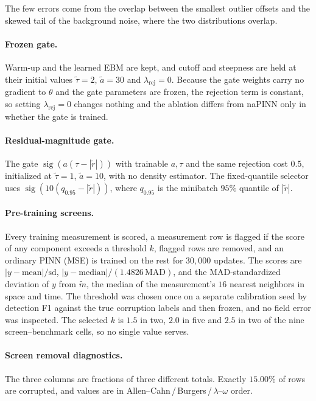 \documentclass[twoside]{article}
\newcommand{\rej}{\lambda_{\mathrm{rej}}}
\DeclareMathOperator{\sig}{sig}
\begin{document}
\noindent
The few errors come from the overlap between the smallest outlier offsets and
the skewed tail of the background noise, where the two distributions overlap.

\paragraph{Frozen gate.}
Warm-up and the learned EBM are kept, and cutoff and steepness are held at their
initial values $\tilde\tau = 2$, $\tilde a = 30$ and $\rej = 0$. Because the gate weights
carry no gradient to $\theta$ and the gate parameters are frozen, the rejection
term is constant, so setting $\rej = 0$ changes nothing and the ablation differs
from naPINN only in whether the gate is trained.

\paragraph{Residual-magnitude gate.}
The gate $\sig(a(\tau - |\tilde r|))$ with trainable $a, \tau$ and the same
rejection cost $0.5$, initialized at $\tilde\tau = 1$, $\tilde a = 10$, with no density
estimator.
The fixed-quantile selector uses $\sig(10(q_{0.95} - |\tilde r|))$, where
$q_{0.95}$ is the minibatch $95\%$ quantile of $|\tilde r|$.

\paragraph{Pre-training screens.}
\label{app:screens}
Every training measurement is scored, a measurement row is flagged if the score
of any component exceeds a threshold $k$, flagged rows are removed, and an ordinary
PINN (MSE) is trained on the rest for $30{,}000$ updates. The scores are
$|y - \mathrm{mean}|/\mathrm{sd}$, $|y - \mathrm{median}|/(1.4826\,
\mathrm{MAD})$, and the MAD-standardized deviation of $y$ from $\tilde m$, the
median of the measurement's $16$ nearest neighbors in space and time. The threshold was chosen once on a separate calibration seed by
detection F1 against the true corruption labels and then frozen, and no field error
was inspected. The selected $k$ is $1.5$ in two, $2.0$ in five and $2.5$ in two
of the nine screen--benchmark cells, so no single value serves.

\paragraph{Screen removal diagnostics.}
The three columns are fractions of three different totals. Exactly $15.00\%$ of
rows are corrupted, and values are in Allen--Cahn\,/\,Burgers\,/\,$\lambda$--$\omega$
order.
\end{document}
